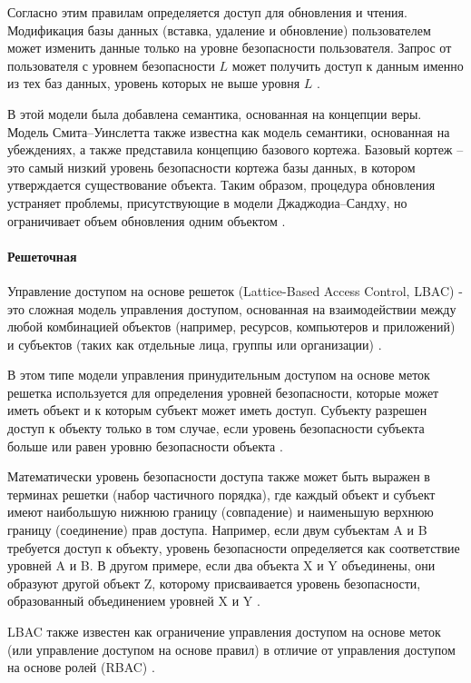Согласно этим правилам определяется доступ для обновления и чтения. Модификация базы данных (вставка, удаление 
и обновление) пользователем может изменить данные только на уровне безопасности пользователя. Запрос от пользователя 
с уровнем безопасности $L$ может получить доступ к данным именно из тех баз данных, уровень которых не выше уровня $L$ 
\autocite{Osama}.

В этой модели была добавлена семантика, основанная на концепции веры. Модель Смита–Уинслетта также известна как 
модель семантики, основанная на убеждениях, а также представила концепцию базового кортежа. Базовый кортеж -- 
это самый низкий уровень безопасности кортежа базы данных, в котором утверждается существование объекта. 
Таким образом, процедура обновления устраняет проблемы, присутствующие в модели Джаджодиа–Сандху, но ограничивает 
объем обновления одним объектом \autocite{Osama}.

\paragraph{Решеточная}

Управление доступом на основе решеток (Lattice-Based Access Control, LBAC) - это сложная модель управления доступом, 
основанная на взаимодействии между любой комбинацией объектов (например, ресурсов, компьютеров и приложений) и 
субъектов (таких как отдельные лица, группы или организации) \autocite{LBAC}.

В этом типе модели управления принудительным доступом на основе меток решетка используется для определения уровней 
безопасности, которые может иметь объект и к которым субъект может иметь доступ. Субъекту разрешен доступ к объекту 
только в том случае, если уровень безопасности субъекта больше или равен уровню безопасности объекта \autocite{LBAC}.

Математически уровень безопасности доступа также может быть выражен в терминах решетки (набор частичного порядка), 
где каждый объект и субъект имеют наибольшую нижнюю границу (совпадение) и наименьшую верхнюю границу (соединение) 
прав доступа. Например, если двум субъектам A и B требуется доступ к объекту, уровень безопасности определяется как 
соответствие уровней A и B. В другом примере, если два объекта X и Y объединены, они образуют другой объект Z, 
которому присваивается уровень безопасности, образованный объединением уровней X и Y \autocite{LBAC}.

LBAC также известен как ограничение управления доступом на основе меток (или управление доступом на основе правил) 
в отличие от управления доступом на основе ролей (RBAC) \autocite{LBAC}.

